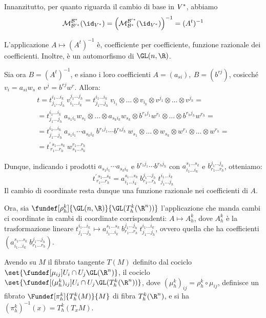 Innanzitutto, per quanto riguarda il cambio di base in $V{^\ast}$, abbiamo \[
\mathcal{M}_{\base' \dual}^{\base \dual}(\id_{V\dual}) = \Big( \mathcal{M}_{\base \dual}^{\base' \dual}(\id_{V\dual}) \Big)^{-1}
= (A^t)^{-1} \]
\begin{oss}
	L'applicazione $A \mapsto (A^t)^{-1}$ è, coefficiente per coefficiente, funzione razionale dei coefficienti. Inoltre, è un automorfismo di $\GL(n, \R)$.
\end{oss}
Sia ora $B = (A^t)^{-1}$, e siano i loro coefficienti $A = (a_{si}), \ B = (b^{rj})$, cosicché $v_i = a_{si} w_s$ e $v^j = b^{rj} w^r$. Allora: 
\begin{gather*}
t =  t_{j_1 \dots j_h}^{i_1 \dots i_k} \ v^{j_1 \dots j_h}_{i_1 \dots i_k} = t_{j_1 \dots j_h}^{i_1 \dots i_k} \ v_{i_1} \otimes \dots \otimes v_{i_k} \otimes v^{j_1} \otimes \dots \otimes v^{j_h} = \\
= t_{j_1 \dots j_h}^{i_1 \dots i_k} \ a_{s_1 i_1}w_{s_1} \otimes \dots \otimes a_{s_k i_k}w_{s_k} \otimes b^{r_1 j_1}w^{r_1} \otimes \dots \otimes b^{r_h j_h}w^{r_h} = \\
= t_{j_1 \dots j_h}^{i_1 \dots i_k} \ a_{s_1 i_1} \dotsm a_{s_k i_k} \ b^{r_1 j_1} \dotsm b^{r_h j_h} \ w_{s_1} \otimes \dots \otimes w_{s_k} \otimes w^{r_1} \otimes \dots \otimes w^{r_h} = \\
= t_{\ r_1 \dots r_h}^{\prime \ s_1 \dots s_k} \ w^{r_1 \dots r_h}_{s_1 \dots s_k}
\end{gather*}

Dunque, indicando i prodotti $a_{s_1 i_1} \dotsm a_{s_k i_k}$ e $b^{r_1 j_1} \dotsm b^{r_h j_h}$ con $a_{i_1 \dots i_k}^{s_1 \dots s_k}$ e $b_{r_1 \dots r_h}^{j_1 \dots j_h}$, otteniamo: \[
t_{\ r_1 \dots r_h}^{\prime \ s_1 \dots s_k} = a_{i_1 \dots i_k}^{s_1 \dots s_k} \ b_{r_1 \dots r_h}^{j_1 \dots j_h} \ t_{j_1 \dots j_h}^{i_1 \dots i_k} \]
Il cambio di coordinate resta dunque una funzione razionale nei coefficienti di $A$.

Ora, sia $\fundef[\rho_h^k]{\GL(n,\R)}{\GL(T_h^k(\R^n))}$ l'applicazione che manda cambi ci coordinate in cambi di coordinate corrispondenti: $A \mapsto A_h^k$, dove $A_h^k$ è la trasformazione lineare $t_{j_1 \dots j_h}^{i_1 \dots i_k} \mapsto a_{i_1 \dots i_k}^{s_1 \dots s_k} \ b_{r_1 \dots r_h}^{j_1 \dots j_h} \ t_{j_1 \dots j_h}^{i_1 \dots i_k}$, ovvero quella che ha coefficienti $(a_{i_1 \dots i_k}^{s_1 \dots s_k} \ b_{r_1 \dots r_h}^{j_1 \dots j_h})$.

Avendo su $M$ il fibrato tangente $T(M)$ definito dal cociclo $\set{ \fundef[\mu_{ij}]{U_i \cap U_j}{\GL(\R^n)} }$, il cociclo $\set{ \fundef[(\mu_h^k)_{ij}]{U_i \cap U_j}{\GL(T_h^k(\R^n))} }$, dove $(\mu_h^k)_{ij} = \rho_h^k \circ \mu_{ij}$, definisce un fibrato $\Fundef[\pi_h^k]{T_h^k(M)}{M}$ di fibra $T_h^k(\R^n)$, e si ha $(\pi_h^k)^{-1}(x) = T_h^k(T_x M)$.

